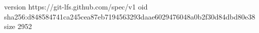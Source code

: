 version https://git-lfs.github.com/spec/v1
oid sha256:d848584741ca245cea87eb7194563293daae6029476048a0b2f30d84dbd80e38
size 2952
